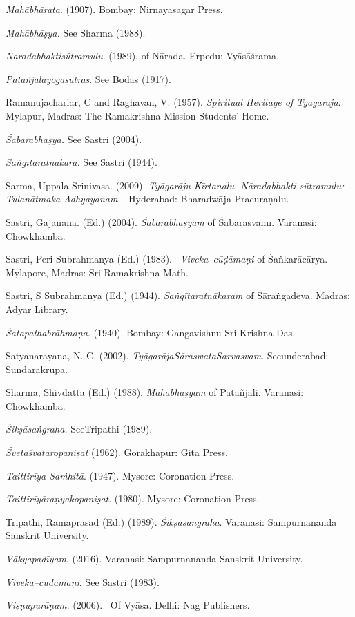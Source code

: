 \begin{thebibliography}{99}
  \textit{Mahābhārata}. (1907). Bombay: Nirnayasagar Press. 

  \textit{Mahābhāṣya.} See Sharma (1988).

  \textit{Naradabhaktisūtramulu}. (1989). of Nārada. Erpedu: Vyāsāśrama.

  \textit{Pātañjalayogasūtras}. See Bodas (1917).

  Ramanujachariar, C and Raghavan, V. (1957). \textit{Spiritual Heritage of Tyagaraja}. Mylapur, Madras: The Ramakrishna Mission Students’ Home.

  \textit{Śābarabhāṣya.} See Sastri (2004).

  \textit{Saṅgītaratnākara.} See Sastri (1944).

  Sarma, Uppala Srinivasa. (2009). \textit{Tyāgarāju Kīrtanalu, Nāradabhakti sūtramulu: Tulanātmaka Adhyayanam}.  Hyderabad: Bharadwāja Pracuraṇalu.

  Sastri, Gajanana. (Ed.) (2004). \textit{Śābarabhāṣyam} of Śabarasvāmī. Varanasi: Chowkhamba.

  Sastri, Peri Subrahmanya (Ed.) (1983).  \textit{Viveka–cūḍāmaṇi} of Śaṅkarācārya. Mylapore, Madras: Sri Ramakrishna Math.

  Sastri, S Subrahmanya (Ed.) (1944). \textit{Saṅgītaratnākaram} of Sāraṅgadeva. Madras: Adyar Library. 

  \textit{Śatapathabrāhmaṇa}. (1940). Bombay: Gangavishnu Sri Krishna Das.

  Satyanarayana, N. C. (2002). \textit{TyāgarājaSāraswataSarvasvam}. Secunderabad: Sundarakrupa. 

  Sharma, Shivdatta (Ed.) (1988). \textit{Mahābhāṣyam} of Patañjali. Varanasi: Chowkhamba.

  \textit{Śikṣāsaṅgraha.} SeeTripathi (1989).

  \textit{Śvetāśvataropaniṣat} (1962). Gorakhapur: Gita Press.

  \textit{Taittirīya Saṁhitā}. (1947). Mysore: Coronation Press.

  \textit{Taittirīyāraṇyakopaniṣat}. (1980). Mysore: Coronation Press. 

  Tripathi, Ramaprasad (Ed.) (1989). \textit{Śikṣāsaṅgraha}. Varanasi: Sampurnananda Sanskrit University. 

  \textit{Vākyapadīyam}. (2016). Varanasi: Sampurnananda Sanskrit University.

  \textit{Viveka–cūḍāmaṇi}. See Sastri (1983).

  \textit{Viṣṇupurāṇam}. (2006).  Of Vyāsa. Delhi: Nag Publishers. \\

 \end{thebibliography}

